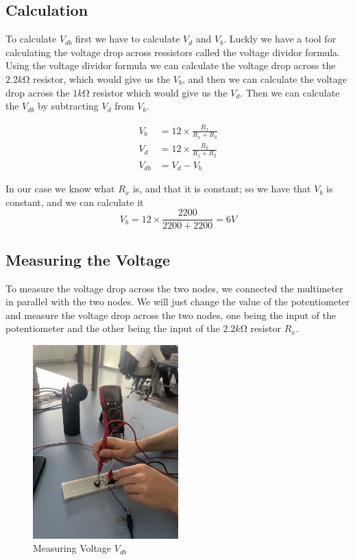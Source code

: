 \documentclass[a4paper, 10pt]{article}
\begin{document}
		\subsection{Calculation}
			To calculate $V_{db}$ first we have to calculate $V_{d}$ and $V_{b}$.
			Luckly we have a tool for calculating the voltage drop across ressistors called the voltage dividor formula.
			Using the voltage dividor formula we can calculate the voltage drop across the $2.2 k\si{\ohm}$ resistor,
			which would give us the $V_b$, and then we can calculate the voltage drop across the $1 k\si{\ohm}$ resistor
			which would give us the $V_d$. Then we can calculate the $V_{db}$ by subtracting $V_d$ from $V_b$.

			\begin{align*}
				V_{b} &= 12 \times \frac{R_x}{R_x + R_3} \\
				V_{d} &= 12 \times \frac{R_2}{R_1 + R_2} \\
				V_{db} &= V_{d} - V_{b}
			\end{align*}

			In our case we know what $R_x$ is, and that it is constant; so we have that $V_b$ is constant, and we can calculate it
			\begin{equation*}
				V_{b} = 12 \times \frac{2200}{2200 + 2200} = 6 V
			\end{equation*}
		
		\pagebreak
		\subsection{Measuring the Voltage}
			To measure the voltage drop across the two nodes, we connected the multimeter in parallel with the two nodes.
			We will just change the value of the potentiometer and measure the voltage drop across the two nodes,
			one being the input of the potentiometer and the other being the input of the $2.2 k\si{\ohm}$ resistor $R_x$.
			\begin{figure}[h!]
				\centering
				\includegraphics[width=0.5\textwidth]{images/MeasuringVoltage.jpeg}
				\caption{Measuring Voltage $V_{db}$}
				\label{fig:multi_meter}	
			\end{figure}
\end{document}
